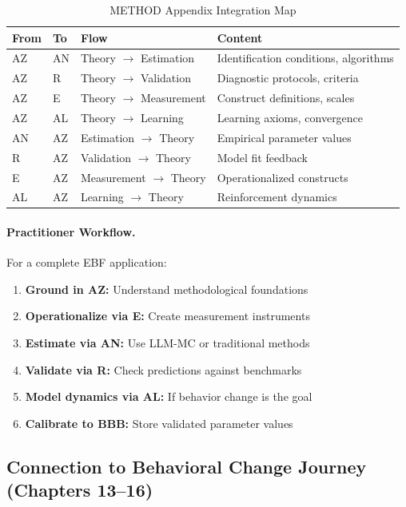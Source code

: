 \begin{table}[htbp]
\centering
\caption{METHOD Appendix Integration Map}
\label{tab:az-method-ecosystem}
\renewcommand{\arraystretch}{1.3}
\begin{tabular}{@{}lllp{4cm}@{}}
\toprule
\textbf{From} & \textbf{To} & \textbf{Flow} & \textbf{Content} \\
\midrule
AZ & AN & Theory $\to$ Estimation & Identification conditions, algorithms \\
AZ & R & Theory $\to$ Validation & Diagnostic protocols, criteria \\
AZ & E & Theory $\to$ Measurement & Construct definitions, scales \\
AZ & AL & Theory $\to$ Learning & Learning axioms, convergence \\
\addlinespace
AN & AZ & Estimation $\to$ Theory & Empirical parameter values \\
R & AZ & Validation $\to$ Theory & Model fit feedback \\
E & AZ & Measurement $\to$ Theory & Operationalized constructs \\
AL & AZ & Learning $\to$ Theory & Reinforcement dynamics \\
\bottomrule
\end{tabular}
\end{table}

\paragraph{Practitioner Workflow.}
For a complete EBF application:
\begin{enumerate}
\item \textbf{Ground in AZ:} Understand methodological foundations
\item \textbf{Operationalize via E:} Create measurement instruments
\item \textbf{Estimate via AN:} Use LLM-MC or traditional methods
\item \textbf{Validate via R:} Check predictions against benchmarks
\item \textbf{Model dynamics via AL:} If behavior change is the goal
\item \textbf{Calibrate to BBB:} Store validated parameter values
\end{enumerate}


\subsection{Connection to Behavioral Change Journey (Chapters 13--16)}


